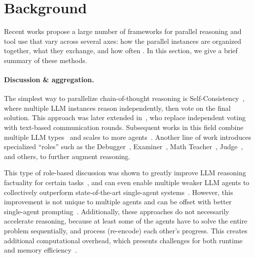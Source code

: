 \vspace{-5px}\section{Background}\label{sect:background}\vspace{-5px}


Recent works propose a large number of frameworks for parallel reasoning and tool use that vary across several axes: how the parallel instances are organized together, what they exchange, and how often \citep{TTSsurvey}. In this section, we give a brief summary of these methods.

\paragraph{Discussion \& aggregation.} The simplest way to parallelize chain-of-thought reasoning is Self-Consistency~\citep{Wang2022SelfConsistencyIC}, where multiple LLM instances reason independently, then vote on the final solution. This approach was later extended in~\cite{du2024improving}, who replace independent voting with text-based communication rounds. Subsequent works in this field combine multiple LLM types~\citep{wang2024mixture} and scales to more agents~\cite{li2024moreagents}. Another line of work introduces specialized ``roles'' such as the Debugger~\citep{talebirad2023multiagent}, Examiner~\citep{cohen-etal-2023-lm}, Math Teacher~\citep{kong-etal-2024-better}, Judge~\citep{chen-etal-2024-reconcile}, and others, to further augment reasoning.

This type of role-based discussion was shown to greatly improve LLM reasoning factuality for certain tasks~\citep{Wang2022SelfConsistencyIC,du2024improving}, and can even enable multiple weaker LLM agents to collectively outperform state-of-the-art single-agent systems~\citep{wang2024mixture}. However, this improvement is not unique to multiple agents and can be offset with better single-agent prompting~\citep{wang-etal-2024-rethinking-bounds,muennighoff2025s1}. Additionally, these approaches do not necessarily accelerate reasoning,  because at least some of the agents have to solve the entire problem sequentially, and process (re-encode) each other's progress. This creates additional computational overhead, which presents challenges for both runtime and memory efficiency~\cite{wang2024mixture,du2024improving}.

